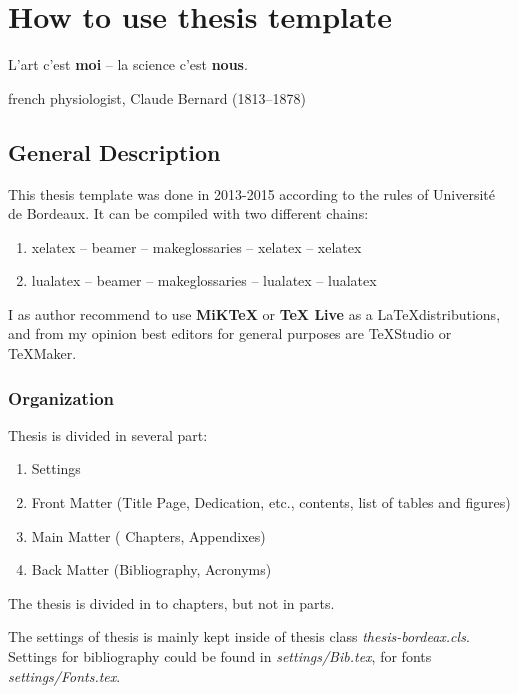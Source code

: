 \chapter{How to use thesis template}
\label{ch:how-to-use}
\epigraph{L'art c'est \textbf{moi} -- la science c'est \textbf{nous}.}{french physiologist, Claude Bernard (1813--1878) }
\startcontents[chapter]
\newpage


\section{General Description}
This thesis template was done in 2013-2015 according to the rules of Université de Bordeaux. It can be compiled with two different chains:
\begin{enumerate}
	\item xelatex -- beamer -- makeglossaries -- xelatex -- xelatex
	\item lualatex -- beamer -- makeglossaries -- lualatex -- lualatex
\end{enumerate}

I as author recommend to use \textbf{MiKTeX} or \textbf{TeX Live} as a \LaTeX distributions, and from my opinion best editors for general purposes are TeXStudio or TeXMaker.


\subsection{Organization}

Thesis is divided in several part:
\begin{enumerate}
	\item Settings
	\item Front Matter (Title Page, Dedication, etc., contents, list of tables and figures)
	\item Main Matter ( Chapters, Appendixes)
	\item Back Matter (Bibliography, Acronyms)
\end{enumerate}

The thesis is divided in to chapters, but not in parts.

The settings of thesis is mainly kept inside of thesis class \textit{thesis-bordeax.cls}. Settings for bibliography could be found in \textit{settings/Bib.tex}, for fonts \textit{settings/Fonts.tex}.

